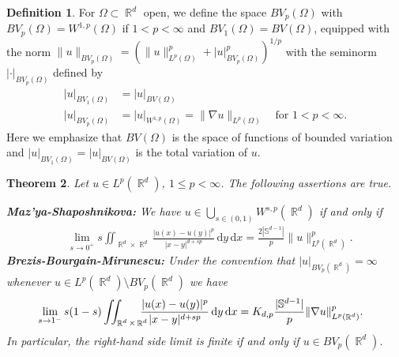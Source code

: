 \documentclass[12pt, reqno]{amsart}%
\theoremstyle{plain}  %
\newtheorem{theorem}{Theorem}[section]
\theoremstyle{definition}  %
\newtheorem{definition}[theorem]{Definition}
\theoremstyle{remark}
\numberwithin{equation}{section}
\DeclareMathOperator{\R}{\mathbb{R}}
\renewcommand{\d}{\,\mathrm{d}}
\begin{document}
\begin{definition}\label{def:bvp-space}
 For $\Omega\subset \R^d$ open,  we define  the space $BV_p(\Omega)$ with $BV_p(\Omega)= W^{1,p}(\Omega)$ if $1< p<\infty$ and $BV_1(\Omega)= BV(\Omega)$, equipped with the norm $\|u\|_{ BV_p(\Omega)} =(\|u\|^p_{L^p(\Omega)} +|u|^p_{BV_p(\Omega)})^{1/p}$ with the seminorm $|\cdot|_{BV_p(\Omega)}$ defined by
\begin{align*}
|u|_{BV_1(\Omega)} &= |u|_{BV(\Omega)} \\
 |u|_{BV_p(\Omega)} &= |u|_{W^{1,p}(\Omega)} = \|\nabla u\|_{L^p(\Omega)} \quad \text{for } 1 < p < \infty.
\end{align*}
Here  we emphasize that $BV(\Omega)$ is the space of functions of bounded variation and  $|u|_{BV_1(\Omega)}= |u|_{BV(\Omega)} $ is the total variation of $u$.
\end{definition}
\begin{theorem}\label{thm:mazy'a-bbm-limit}
Let $u\in L^p(\R^d)$, $1\leq p<\infty$. The following assertions are true.
\smallskip

\textbf{Maz'ya-Shaposhnikova:} We have  $u\in \bigcup_{s\in (0,1)} W^{s, p}(\R^d)$ if and only if
\begin{align*}
&\lim_{s\to0^+} s \iint_{\R^d \times \R^d} \frac{ |u(x) - u(y)|^p}{|x-y|^{d+s p}}\d y\d x=  \frac{2|\mathbb{S}^{d-1}|}{p}\|u\|^p_{L^p(\R^d)}.
\end{align*}
\textbf{Brezis-Bourgain-Mirunescu:}
Under the convention that $|u|_{BV_p(\R^{d})}=\infty$ whenever
$u\in L^p(\R^{d})\setminus BV_p(\R^{d})$ we have
\begin{align*}
&\lim_{s\to1^-}s(1-s)\iint_{\R^d \times \R^d}\hspace{-2ex} \frac{ |u(x) - u(y)|^p}{|x-y|^{d+s p}}\d y \d x=K_{d,p}\frac{|\mathbb{S}^{d-1}|}{p}\|\nabla u\|^p_{L^p(\R^d)}.
\end{align*}
In particular, the right-hand side limit  is finite if and only if
$u\in BV_p(\R^d)$.

\end{theorem}
\end{document}
